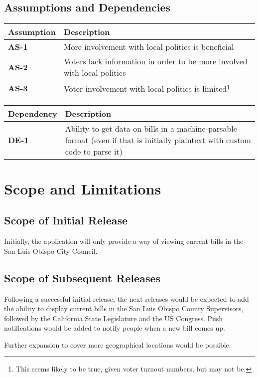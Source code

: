 \subsection{Assumptions and Dependencies}
\begin{tabu}{lX}
  \toprule
  Assumption    & Description \\
  \midrule
  \textbf{AS-1} & More involvement with local politics is beneficial \\

  \textbf{AS-2} & Voters lack information in order to be more involved
  with local politics \\
  \textbf{AS-3} & Voter involvement with local politics is
  limited\footnote{This seems likely to be true, given voter turnout
    numbers, but may not be.} \\
  \bottomrule
\end{tabu}
\vspace{.3in}
\noindent\begin{tabu}{lX}
  \toprule
  Dependency    & Description \\
  \midrule
  \textbf{DE-1} &
  Ability to get data on bills in a machine-parsable format (even if
  that is initially plaintext with custom code to parse it) \\
  \bottomrule
\end{tabu}

\section{Scope and Limitations}
\subsection{Scope of Initial Release}
Initially, the application will only provide a way of viewing current
bills in the San Luis Obispo City Council.

\subsection{Scope of Subsequent Releases}
Following a successful initial release, the next releases would be
expected to add the ability to display current bills in the San Luis
Obispo County Supervisors, followed by the California State
Legislature and the US Congress. Push notifications would be added to
notify people when a new bill comes up.

Further expansion to cover more geographical locations would be possible.


